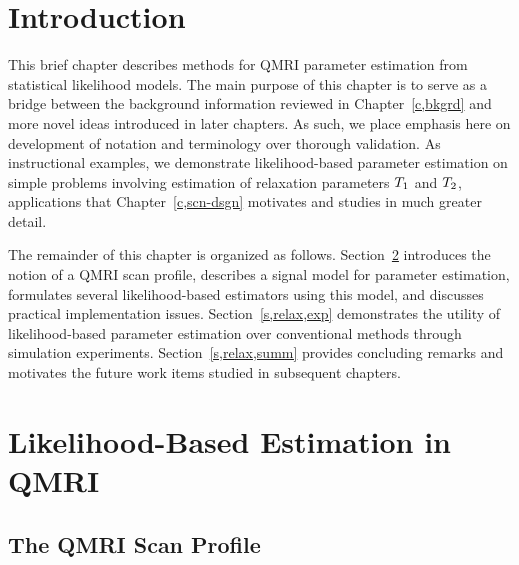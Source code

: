
\section{Introduction}
\label{s,relax,intro}

This brief chapter describes methods
for QMRI parameter estimation
from statistical likelihood models.
The main purpose of this chapter
is to serve as a bridge 
between the background information
reviewed in Chapter~\ref{c,bkgrd}
and more novel ideas 
introduced in later chapters.
As such, 
we place emphasis here
on development of notation and terminology
over thorough validation.
As instructional examples,
we demonstrate likelihood-based parameter estimation
on simple problems
involving estimation 
of relaxation parameters $T_1$ and $T_2$,
applications
that Chapter~\ref{c,scn-dsgn} motivates and studies 
in much greater detail.

The remainder of this chapter 
is organized as follows.
Section~\ref{s,relax,meth}
introduces the notion of a QMRI scan profile,
describes a signal model for parameter estimation,
formulates several likelihood-based estimators
using this model,
and discusses practical implementation issues.
Section~\ref{s,relax,exp}
demonstrates the utility
of likelihood-based parameter estimation
over conventional methods
through 
simulation experiments.
Section~\ref{s,relax,summ}
provides concluding remarks
and motivates the future work items
studied in subsequent chapters.

\section{Likelihood-Based Estimation in QMRI}
\label{s,relax,meth}

\subsection{The QMRI Scan Profile}
\label{ss,relax,meth,prof}

